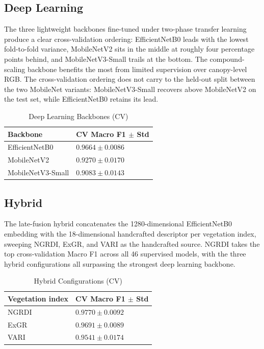 \subsection{Deep Learning}

The three lightweight backbones fine-tuned under two-phase transfer learning produce a clear cross-validation ordering: EfficientNetB0 leads with the lowest fold-to-fold variance, MobileNetV2 sits in the middle at roughly four percentage points behind, and MobileNetV3-Small trails at the bottom. The compound-scaling backbone benefits the most from limited supervision over canopy-level RGB. The cross-validation ordering does not carry to the held-out split between the two MobileNet variants: MobileNetV3-Small recovers above MobileNetV2 on the test set, while EfficientNetB0 retains its lead.

\begin{table}[H]
    \centering
    \caption{Deep Learning Backbones (CV)}
    \label{tab:cv-dl}
    \begin{tabular}{ll}
        \hline
        Backbone & CV Macro F1 $\pm$ Std \\
        \hline
        EfficientNetB0      & $0.9664 \pm 0.0086$ \\
        MobileNetV2         & $0.9270 \pm 0.0170$ \\
        MobileNetV3-Small   & $0.9083 \pm 0.0143$ \\
        \hline
    \end{tabular}
\end{table}

\subsection{Hybrid}

The late-fusion hybrid concatenates the 1280-dimensional EfficientNetB0 embedding with the 18-dimensional handcrafted descriptor per vegetation index, sweeping NGRDI, ExGR, and VARI as the handcrafted source. NGRDI takes the top cross-validation Macro F1 across all 46 supervised models, with the three hybrid configurations all surpassing the strongest deep learning backbone.

\begin{table}[H]
    \centering
    \caption{Hybrid Configurations (CV)}
    \label{tab:cv-hybrid}
    \begin{tabular}{ll}
        \hline
        Vegetation index & CV Macro F1 $\pm$ Std \\
        \hline
        NGRDI & $\mathbf{0.9770 \pm 0.0092}$ \\
        ExGR  & $0.9691 \pm 0.0089$ \\
        VARI  & $0.9541 \pm 0.0174$ \\
        \hline
    \end{tabular}
\end{table}

